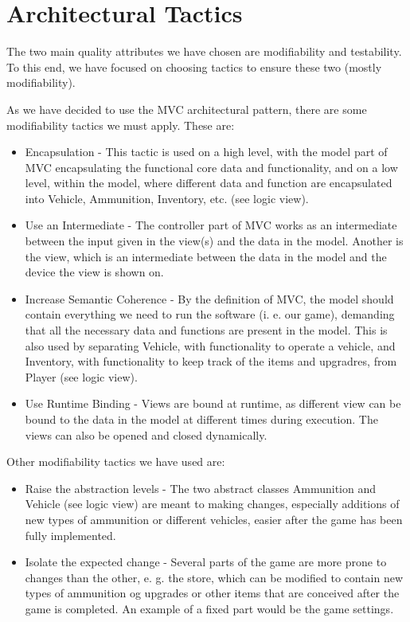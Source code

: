 \chapter{Architectural Tactics}
The two main quality attributes we have chosen are modifiability and testability. To this end, we have focused on choosing tactics to ensure these two (mostly modifiability).

As we have decided to use the MVC architectural pattern, there are some modifiability tactics we must apply. These are:

\begin{itemize}
	\item{Encapsulation - This tactic is used on a high level, with the model part of MVC encapsulating the functional core data and functionality, and on a low level, within the model, where different data and function are encapsulated into Vehicle, Ammunition, Inventory, etc. (see logic view).}
	\item{Use an Intermediate - The controller part of MVC works as an intermediate between the input given in the view(s) and the data in the model. Another is the view, which is an intermediate between the data in the model and the device the view is shown on.}
	\item{Increase Semantic Coherence - By the definition of MVC, the model should contain everything we need to run the software (i. e. our game), demanding that all the necessary data and functions are present in the model. This is also used by separating Vehicle, with functionality to operate a vehicle, and Inventory, with functionality to keep track of the items and upgradres, from Player (see logic view).}
	\item{Use Runtime Binding - Views are bound at runtime, as different view can be bound to the data in the model at different times during execution. The views can also be opened and closed dynamically.}

\end{itemize}

Other modifiability tactics we have used are:

\begin{itemize}
	\item{Raise the abstraction levels - The two abstract classes Ammunition and Vehicle (see logic view) are meant to making changes, especially additions of new types of ammunition or different vehicles, easier after the game has been fully implemented.}
	\item{Isolate the expected change - Several parts of the game are more prone to changes than the other, e. g. the store, which can be modified to contain new types of ammunition og upgrades or other items that are conceived after the game is completed. An example of a fixed part would be the game settings.}
\end{itemize}

